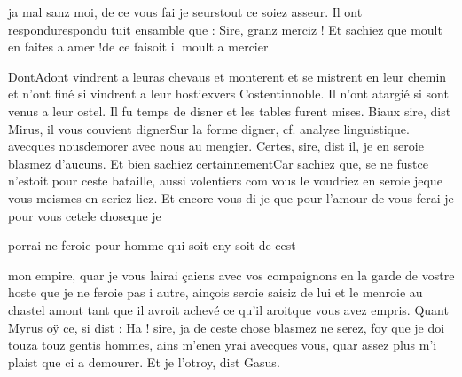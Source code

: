 \documentclass{article}
\begin{document}
\begin{pages}
                     ja mal sanz moi, de 
                     ce vous fai je seurstout ce soiez asseur. Il ont 
                  respondurespondu tuit ensamble que :
                  Sire, granz merciz ! Et
                        sachiez que moult en faites a amer !de ce faisoit il moult a mercier
               
                  DontAdont vindrent 
                  a leuras chevaus et monterent et se mistrent 
                  en leur chemin et 
                        n’ont finé si vindrent a leur hostiexvers Costentinnoble. Il n'ont atargié si sont venus a leur
                     ostel. Il fu temps de disner et les tables furent mises. Biaux sire, dist Mirus, il vous
                  couvient 
                     dignerSur la forme digner, cf.
                           analyse linguistique. avecques nousdemorer avec nous au mengier.
               Certes, 
                     sire, dist il, je en seroie blasmez d’aucuns. 
                     Et bien sachiez certainnementCar sachiez que, se 
                     ne fustce n'estoit pour ceste bataille, aussi volentiers 
                     com vous le voudriez en seroie jeque vous meismes en seriez liez. Et encore vous di je que pour l'amour de vous ferai je 
                     pour vous cetele choseque je 
                     
                     porrai ne feroie pour homme qui 
                     soit eny soit de cest 
                     
                     mon empire, quar je vous lairai çaiens avec vos compaignons en la garde de vostre hoste que je ne feroie pas
                     i autre, ainçois seroie saisiz de lui et le menroie au chastel amont tant que il avroit achevé ce 
                     qu’il aroitque vous avez empris. Quant Myrus oÿ ce, si dist
               : Ha ! sire, ja de ceste chose blasmez ne serez, foy
                  que je doi 
                     touza touz gentis hommes, ains 
                     m’enen yrai avecques vous, quar assez plus m’i plaist que ci a demourer.
               Et je l’otroy, dist Gasus.
               

\end{pages}
\end{document}

